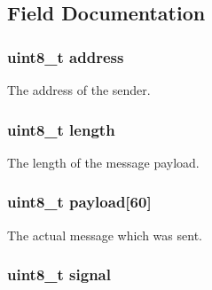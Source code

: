 \subsection{Field Documentation}
\hypertarget{struct_listen___struct_af3f726014b044194def151079f1f2d89}{}
\subsubsection[{address}]{\setlength{\rightskip}{0pt plus 5cm}uint8\+\_\+t address}\label{struct_listen___struct_af3f726014b044194def151079f1f2d89}


The address of the sender. 

\hypertarget{struct_listen___struct_ab2b3adeb2a67e656ff030b56727fd0ac}{}
\subsubsection[{length}]{\setlength{\rightskip}{0pt plus 5cm}uint8\+\_\+t length}\label{struct_listen___struct_ab2b3adeb2a67e656ff030b56727fd0ac}


The length of the message payload. 

\hypertarget{struct_listen___struct_a42f5829f7500fa6bbe09fa18aec20cb6}{}
\subsubsection[{payload}]{\setlength{\rightskip}{0pt plus 5cm}uint8\+\_\+t payload\mbox{[}60\mbox{]}}\label{struct_listen___struct_a42f5829f7500fa6bbe09fa18aec20cb6}


The actual message which was sent. 

\hypertarget{struct_listen___struct_a7c1b70b404e83272e560887ddd8daf14}{}
\subsubsection[{signal}]{\setlength{\rightskip}{0pt plus 5cm}uint8\+\_\+t signal}\label{struct_listen___struct_a7c1b70b404e83272e560887ddd8daf14}


